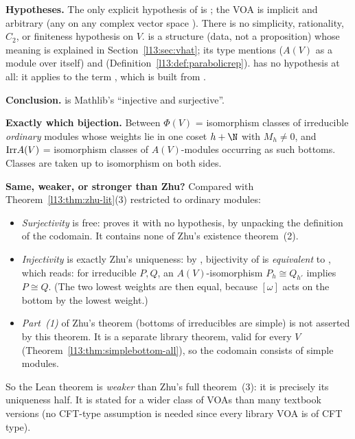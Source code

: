 \begin{dictionary}
\textbf{Hypotheses.} The only explicit hypothesis of  is ; the VOA  is implicit and
arbitrary (any  on any complex vector space ). There is no simplicity, rationality,
$C_2$, or finiteness hypothesis on $V$.  is a structure (data, not a proposition) whose meaning is explained in
Section~\ref{l13:sec:vhat}; its type mentions  ($A(V)$ as a module over itself) and
 (Definition~\ref{l13:def:parabolicrep}).  has no hypothesis at all:
it applies  to the term , which is built from .

\textbf{Conclusion.}  is Mathlib's ``injective and surjective''.

\textbf{Exactly which bijection.} Between $\Phi(V)$ = isomorphism classes of irreducible \emph{ordinary} modules whose
weights lie in one coset $h+\N$ with $M_h\neq0$, and $\mathrm{Irr} A(V)$ = isomorphism classes of $A(V)$-modules
occurring as such bottoms. Classes are taken up to isomorphism on both sides.

\textbf{Same, weaker, or stronger than Zhu?} Compared with Theorem~\ref{l13:thm:zhu-lit}(3) restricted to ordinary
modules:
\begin{itemize}
\item \emph{Surjectivity} is free:  proves it with no hypothesis, by unpacking the
  definition of the codomain. It contains none of Zhu's existence theorem~(2).
\item \emph{Injectivity} is exactly Zhu's uniqueness: by , bijectivity
  of  is \emph{equivalent} to , which reads: for irreducible $P,Q$, an
  $A(V)$-isomorphism $P_h\cong Q_{h'}$ implies $P\cong Q$. (The two lowest weights are then equal, because $[\omega]$ acts
  on the bottom by the lowest weight.)
\item \emph{Part~(1)} of Zhu's theorem (bottoms of irreducibles are simple) is not asserted by this theorem. It is a
  separate library theorem, valid for every $V$ (Theorem~\ref{l13:thm:simplebottom-all}), so the codomain consists of
  simple modules.
\end{itemize}
So the Lean theorem is \emph{weaker} than Zhu's full theorem~(3): it is precisely its uniqueness half. It is stated for a
wider class of VOAs than many textbook versions (no CFT-type assumption is needed since every library VOA is of CFT type).


\end{dictionary}
